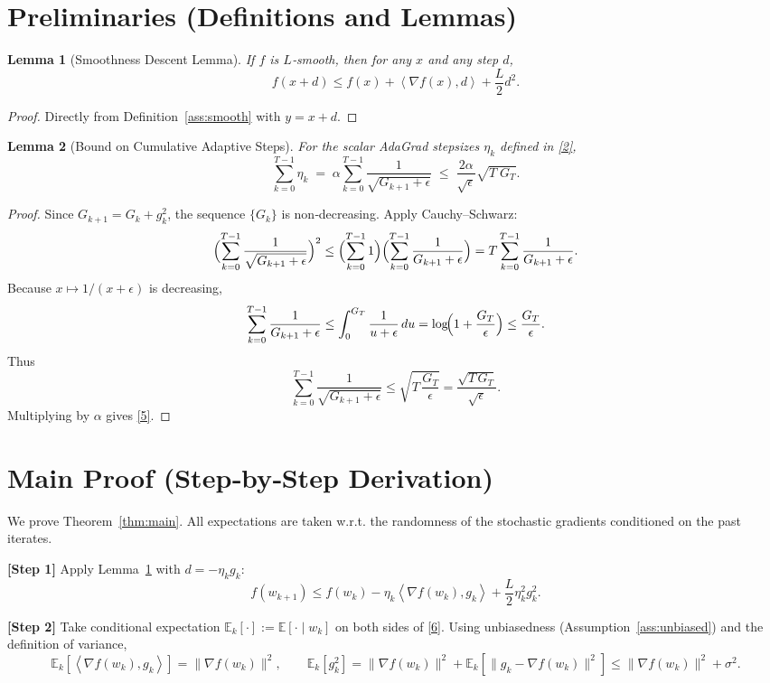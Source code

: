 \documentclass{article}
\newtheorem{lemma}{Lemma}
\newcommand{\E}{\mathbb{E}}
\newcommand{\inner}[2]{\left\langle #1,#2\right\rangle}
\begin{document}
\section*{Preliminaries (Definitions and Lemmas)}
\begin{lemma}[Smoothness Descent Lemma]\label{lem:smooth}
If $f$ is $L$‑smooth, then for any $x$ and any step $d$,
\[
f(x+d)\le f(x)+\inner{\nabla f(x)}{d}+\frac{L}{2}d^{2}.
\]
\end{lemma}
\begin{proof}
Directly from Definition~\ref{ass:smooth} with $y=x+d$.
\end{proof}

\begin{lemma}[Bound on Cumulative Adaptive Steps]\label{lem:stepsum}
For the scalar AdaGrad stepsizes $\eta_k$ defined in \eqref{2},
\[
\sum_{k=0}^{T-1}\eta_k \;=\;
\alpha\sum_{k=0}^{T-1}\frac{1}{\sqrt{G_{k+1}+\epsilon}}
\;\le\;
\frac{2\alpha}{\sqrt{\epsilon}}\sqrt{T\;G_{T} } .
\tag{5}
\]
\end{lemma}
\begin{proof}
Since $G_{k+1}=G_k+g_k^{2}$, the sequence $\{G_k\}$ is non‑decreasing.
Apply Cauchy–Schwarz:
\[
\Bigl(\sum_{k=0}^{T-1}\frac{1}{\sqrt{G_{k+1}+\epsilon}}\Bigr)^{2}
\le
\Bigl(\sum_{k=0}^{T-1}1\Bigr)\Bigl(\sum_{k=0}^{T-1}\frac{1}{G_{k+1}+\epsilon}\Bigr)
= T\sum_{k=0}^{T-1}\frac{1}{G_{k+1}+\epsilon}.
\]
Because $x\mapsto 1/(x+\epsilon)$ is decreasing,
\[
\sum_{k=0}^{T-1}\frac{1}{G_{k+1}+\epsilon}
\le
\int_{0}^{G_T}\frac{1}{u+\epsilon}\,du
= \log\!\Bigl(1+\frac{G_T}{\epsilon}\Bigr)
\le \frac{G_T}{\epsilon}.
\]
Thus
\[
\sum_{k=0}^{T-1}\frac{1}{\sqrt{G_{k+1}+\epsilon}}
\le
\sqrt{T\,\frac{G_T}{\epsilon}}
= \frac{\sqrt{T\,G_T}}{\sqrt{\epsilon}} .
\]
Multiplying by $\alpha$ gives \eqref{5}.
\end{proof}

\section*{Main Proof (Step‑by‑Step Derivation)}
We prove Theorem~\ref{thm:main}.  
All expectations are taken w.r.t. the randomness of the stochastic gradients
conditioned on the past iterates.

\noindent\textbf{[Step 1]} Apply Lemma~\ref{lem:smooth} with $d=-\eta_k g_k$:
\[
f(w_{k+1})\le f(w_k)-\eta_k\inner{\nabla f(w_k)}{g_k}
+\frac{L}{2}\eta_k^{2}g_k^{2}. \tag{6}
\]

\noindent\textbf{[Step 2]} Take conditional expectation $\E_{k}[\cdot]
:=\E[\cdot\mid w_k]$ on both sides of \eqref{6}.
Using unbiasedness (Assumption~\ref{ass:unbiased}) and the definition of variance,
\[
\E_{k}[ \inner{\nabla f(w_k)}{g_k} ]
= \|\nabla f(w_k)\|^{2},
\qquad
\E_{k}[ g_k^{2} ] = \|\nabla f(w_k)\|^{2} + \E_{k}[\|g_k-\nabla f(w_k)\|^{2}]
\le \|\nabla f(w_k)\|^{2}+\sigma^{2}. \tag{7}
\]
\end{document}
